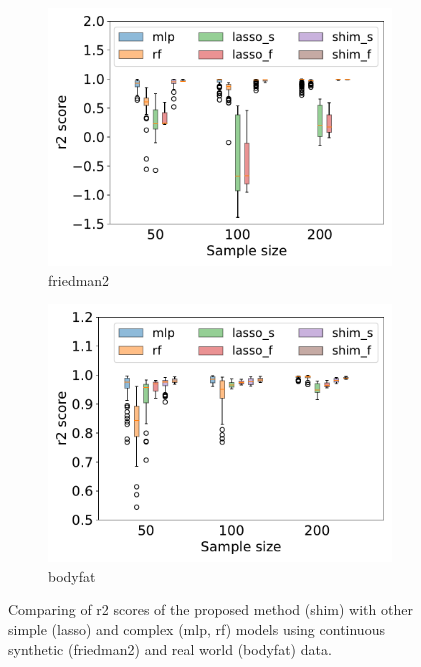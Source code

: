 \documentclass{article}
\begin{document}
\begin{figure}[h!]
\begin{subfigure}{0.4\textwidth}
\centering
    \includegraphics[width=\textwidth]{figures/r2_friedman2_continuous_50_100_200_.pdf}
    \caption{friedman2}
    \label{fig:1}
\end{subfigure}
\hfill
\begin{subfigure}{0.4\textwidth}
\centering
    \includegraphics[width=\textwidth]{figures/r2_bodyfat_50_100_200__.pdf}
     \caption{bodyfat}
    \label{fig:2}
\end{subfigure}
\caption{Comparing of r2 scores of the proposed method (shim) with other simple (lasso) and complex (mlp, rf) models using continuous synthetic (friedman2) and real world (bodyfat) data.}
\end{figure}
\end{document}
